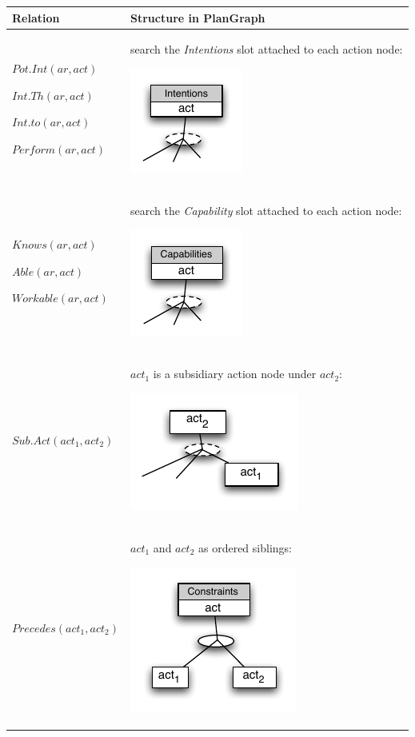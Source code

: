\begin{table}[htbp]
\centering
\footnotesize
\begin{tabular}{>{\raggedright}p{1.5in}>{\raggedright}p{4in}}

\toprule 
Relation & Structure in PlanGraph\tabularnewline
\midrule 
$Pot.Int(ar,act)$ \par $Int.Th(ar,act)$ \par $Int.to(ar,act)$ \par $Perform(ar,act)$ & search the \emph{Intentions} slot attached to each action node: 
\par \includegraphics{intentions.pdf}\tabularnewline
\midrule 
$Knows(ar,act)$ \par $Able(ar,act)$ \par $Workable(ar,act)$ & search the \emph{Capability} slot attached to each action node: 
\par \includegraphics{capabilities.pdf}\tabularnewline
\midrule 
$Sub.Act(act_1, act_2)$ &  $act_1$ is a subsidiary action node under $act_2$: 
\par \includegraphics{sub_act.pdf} \tabularnewline
\midrule 
$Precedes(act_1, act_2)$ &  $act_1$ and $act_2$ as ordered siblings: 
\par \includegraphics{precedes.pdf}\tabularnewline

\end{tabular}
\end{table}
